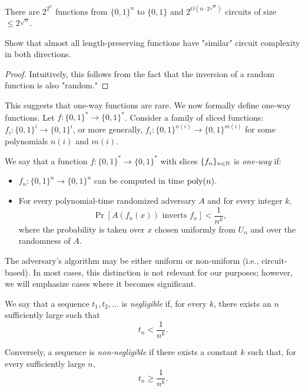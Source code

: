 \begin{statement}
    There are $2^{2^n}$ functions from $\{0, 1\}^n$ to $\{0, 1\}$ and $2^{O(n \cdot 2^{\sqrt n})}$ circuits of size $\leq 2^{\sqrt n}$.
\end{statement}

\begin{exercise}
    Show that almost all length-preserving functions have "similar" circuit complexity in both directions.
\end{exercise}

\begin{proof}
	Intuitively, this follows from the fact that the inversion of a random function is also "random."
\end{proof}

This suggests that one-way functions are rare.
We now formally define one-way functions.
Let $f \colon \{0, 1\}^* \to \{0, 1\}^*$.
Consider a family of sliced functions: $f_i \colon \{0, 1\}^i \to \{0, 1\}^i$, or more generally, $f_i \colon \{0, 1\}^{n(i)} \to \{0, 1\}^{m(i)}$ for some polynomials $n(i)$ and $m(i)$.

\begin{definition}
    We say that a function $f \colon \{0, 1\}^* \to \{0, 1\}^*$ with slices $\{f_n\}_{n \in \mathbb{N}}$ is \emph{one-way} if:
    \begin{itemize}
        \item $f_n \colon \{0, 1\}^n \to \{0, 1\}^n$ can be computed in time $\operatorname{poly}(n)$.
        \item For every polynomial-time randomized adversary $A$ and for every integer $k$,
        \[
            \Pr[A(f_n(x)) \text{ inverts } f_n] < \frac{1}{n^k},
        \] 
        where the probability is taken over $x$ chosen uniformly from $U_n$ and over the randomness of $A$.
    \end{itemize}
\end{definition}

The adversary's algorithm may be either uniform or non-uniform (i.e., circuit-based).
In most cases, this distinction is not relevant for our purposes; however, we will emphasize cases where it becomes significant.

\begin{definition}
    We say that a sequence $t_1, t_2, \ldots$ is \emph{negligible} if, for every $k$, there exists an $n$ sufficiently large such that
    \[
        t_n < \frac{1}{n^k}.
    \]
    
    Conversely, a sequence is \emph{non-negligible} if there exists a constant $k$ such that, for every sufficiently large $n$, 
    \[
        t_n \geq \frac{1}{n^k}.
    \]
\end{definition}

